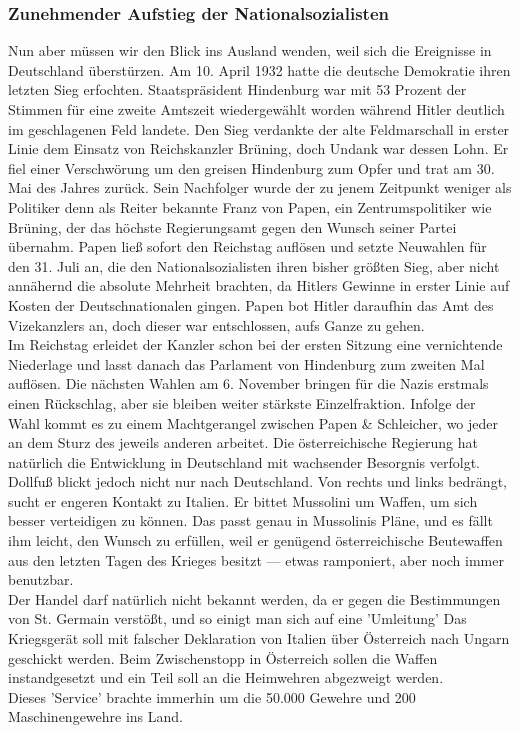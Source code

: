 \documentclass[letterpaper, 12pt]{article}
\let\tempsubsubsection\subsubsection
\renewcommand\subsubsection[1]{\vspace{0cm}\tempsubsubsection{#1}\vspace{0cm}}
\begin{document}
\subsubsection{Zunehmender Aufstieg der Nationalsozialisten}
Nun aber müssen wir den Blick ins Ausland wenden, weil sich die Ereignisse in Deutschland überstürzen. Am 10. April 1932 hatte die deutsche Demokratie ihren letzten Sieg erfochten. Staatspräsident Hindenburg war mit 53 Prozent der Stimmen für eine zweite Amtszeit wiedergewählt worden während Hitler deutlich im geschlagenen Feld landete. Den Sieg verdankte der alte Feldmarschall in erster Linie dem Einsatz von Reichskanzler Brüning, doch Undank war dessen Lohn. Er fiel einer Verschwörung um den greisen Hindenburg zum Opfer und trat am 30. Mai des Jahres zurück.
Sein Nachfolger wurde der zu jenem Zeitpunkt weniger als Politiker denn als Reiter bekannte Franz von Papen, ein Zentrumspolitiker wie Brüning, der das höchste Regierungsamt gegen den Wunsch seiner Partei übernahm. Papen ließ sofort den Reichstag auflösen und setzte Neuwahlen für den 31. Juli an, die den Nationalsozialisten ihren bisher größten Sieg, aber nicht annähernd die absolute Mehrheit brachten, da Hitlers Gewinne in erster Linie auf Kosten der Deutschnationalen gingen. Papen bot Hitler daraufhin das Amt des Vizekanzlers an, doch dieser war entschlossen, aufs Ganze zu gehen. \\
Im Reichstag erleidet der Kanzler schon bei der ersten Sitzung eine vernichtende Niederlage und lasst danach das Parlament von Hindenburg zum zweiten Mal auflösen. Die nächsten Wahlen am 6. November bringen für die Nazis erstmals einen Rückschlag, aber sie bleiben weiter stärkste Einzelfraktion. Infolge der Wahl kommt es zu einem Machtgerangel zwischen Papen \& Schleicher, wo jeder an dem Sturz des jeweils anderen arbeitet. Die österreichische Regierung hat natürlich die Entwicklung in Deutschland mit wachsender Besorgnis verfolgt. \\
Dollfuß blickt jedoch nicht nur nach Deutschland. Von rechts und links bedrängt, sucht er engeren Kontakt zu Italien. Er bittet Mussolini um Waffen, um sich besser verteidigen zu können. Das passt genau in Mussolinis Pläne, und es fällt ihm leicht, den Wunsch zu erfüllen, weil er genügend österreichische Beutewaffen aus den letzten Tagen des Krieges besitzt — etwas ramponiert, aber noch immer benutzbar. \\ Der Handel darf natürlich nicht bekannt werden, da er gegen die Bestimmungen von St. Germain verstößt, und so einigt man sich auf eine 'Umleitung' Das Kriegsgerät soll mit falscher Deklaration von Italien über Österreich nach Ungarn geschickt werden. Beim Zwischenstopp in Österreich sollen die Waffen instandgesetzt und ein Teil soll an die Heimwehren abgezweigt werden. \\ Dieses 'Service' brachte immerhin um die 50.000 Gewehre und 200 Maschinengewehre ins Land. \\
\end{document}
